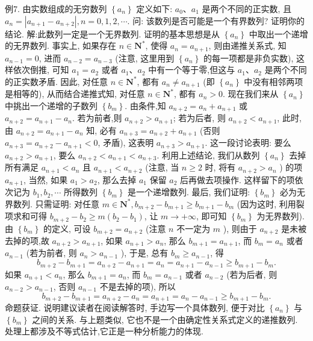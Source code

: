 例7. 由实数组成的无穷数列 $\left\{a_n\right\}$ 定义如下: $a_0 、 a_1$ 是两个不同的正实数, 且 $a_n=\left|a_{n+1}-a_{n+2}\right|, n=0,1,2, \cdots$. 问: 该数列是否可能是一个有界数列? 证明你的结论.
解:此数列一定是一个无界数列.
证明的基本思想是从 $\left\{a_n\right\}$ 中取出一个递增的无界数列.
事实上, 如果存在 $n \in \mathbf{N}^*$, 使得 $a_n=a_{n+1}$, 则由递推关系式, 知 $a_{n-1}=0$, 进而 $a_{n-2}=a_{n-3}$ (注意, 这里用到 $\left\{a_n\right\}$ 的每一项都是非负实数), 这样依次倒推, 可知 $a_1=a_2$ 或者 $a_1 、 a_2$ 中有一个等于零,但这与 $a_1 、 a_2$ 是两个不同的正实数矛盾.
因此, 对任意 $n \in \mathbf{N}^*$, 都有 $a_n \neq a_{n+1}$ (即 $\left\{a_n\right\}$ 中没有相邻两项是相等的), 从而结合递推式知, 对任意 $n \in \mathbf{N}^*$, 都有 $a_n>0$.
现在我们来从 $\left\{a_n\right\}$ 中挑出一个递增的子数列 $\left\{b_m\right\}$.
由条件,知 $a_{n+2}=a_n+a_{n+1}$ 或 $a_{n+2}=a_{n+1}-a_n$. 若为前者,则 $a_{n+2}>a_{n+1}$; 若为后者, 则 $a_{n+2}<a_{n+1}$, 此时, 由 $a_{n+2}=a_{n+1}-a_n$ 知, 必有 $a_{n+3}=a_{n+2}+ a_{n+1}$ (否则 $a_{n+3}=a_{n+2}-a_{n+1}<0$, 矛盾), 这表明 $a_{n+3}>a_{n+1}$. 这一段讨论表明: 要么 $a_{n+2}>a_{n+1}$, 要么 $a_{n+2}<a_{n+1}<a_{n+3}$.
利用上述结论, 我们从数列 $\left\{a_n\right\}$ 去掉所有满足 $a_{n+1}<a_n$ 且 $a_{n+1}<a_{n+2}$ (注意, 当 $n \geqslant 2$ 时, 将有 $a_{n+2}>a_n$ ) 的项 $a_{n+1}$, 当然, 如果 $a_1>a_2$, 那么去掉 $a_1$ 保留 $a_2$ 后再做去项操作.
这样留下的项依次记为 $b_1, b_2, \cdots$ 所得数列 $\left\{b_m\right\}$ 是一个递增数列.
最后, 我们证明: $\left\{b_m\right\}$ 必为无界数列.
只需证明: 对任意 $m \in \mathbf{N}^*, b_{m+2}-b_{m+1} \geqslant b_{m+1}-b_m$ (因为这时, 利用裂项求和可得 $b_{m+2}-b_2 \geqslant m\left(b_2-b_1\right)$, 让 $m \rightarrow+\infty$, 即可知 $\left\{b_m\right\}$ 为无界数列).
由 $\left\{b_m\right\}$ 的定义, 可设 $b_{m+2}=a_{n+2}$ (注意 $n$ 不一定为 $m$ ), 则由于 $a_{n+2}$ 是未被去掉的项,故 $a_{n+2}>a_{n+1}$, 如果 $a_{n+1}>a_n$, 那么 $b_{m+1}=a_{n+1}$, 而 $b_m=a_n$ 或者 $a_{n-1}$ (若为前者, 则 $a_n>a_{n-1}$ ), 于是, 总有 $b_m \geqslant a_{n-1}$, 得
$$
b_{m+2}-b_{m+1}=a_{n+2}-a_{n+1}=a_n=a_{n+1}-a_{n-1} \geqslant b_{m+1}-b_m .
$$
如果 $a_{n+1}<a_n$, 那么 $b_{m+1}=a_n$, 而 $b_m=a_{n-1}$ 或者 $a_{n-2}$ (若为后者, 则 $a_{n-2}> a_{n-1}$, 否则 $a_{n-1}$ 不是去掉的项), 所以
$$
b_{m+2}-b_{m+1}=a_{n+2}-a_n=a_{n+1}=a_n-a_{n-1} \geqslant b_{m+1}-b_m .
$$
命题获证.
说明建议读者在阅读解答时, 手边写一个具体数列, 便于对比 $\left\{a_n\right\}$ 与 $\left\{b_m\right\}$ 之间的关系.
与上题类似, 它也不是一个由确定性关系式定义的递推数列.
处理上都涉及不等式估计,它正是一种分析能力的体现.



